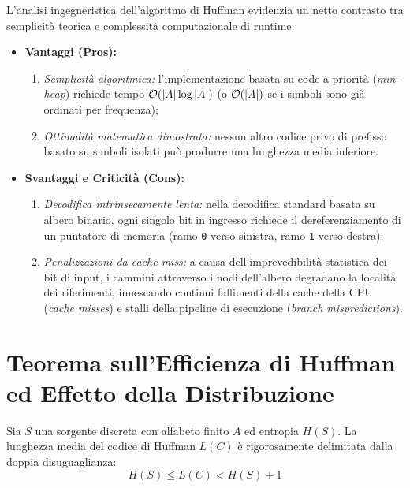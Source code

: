L'analisi ingegneristica dell'algoritmo di Huffman evidenzia un netto contrasto tra semplicit\`a teorica e complessit\`a computazionale di runtime:

\begin{itemize}
  \item \textbf{Vantaggi (Pros):}
  \begin{enumerate}
    \item \textit{Semplicit\`a algoritmica:} l'implementazione basata su code a priorit\`a (\textit{min-heap}) richiede tempo $\mathcal{O}\!\left(\vert A \vert \log \vert A \vert\right)$ (o $\mathcal{O}\!\left(\vert A \vert\right)$ se i simboli sono gi\`a ordinati per frequenza);
    \item \textit{Ottimalit\`a matematica dimostrata:} nessun altro codice privo di prefisso basato su simboli isolati pu\`o produrre una lunghezza media inferiore.
  \end{enumerate}

  \item \textbf{Svantaggi e Criticit\`a (Cons):}
  \begin{enumerate}
    \item \textit{Decodifica intrinsecamente lenta:} nella decodifica standard basata su albero binario, ogni singolo bit in ingresso richiede il dereferenziamento di un puntatore di memoria (ramo \texttt{0} verso sinistra, ramo \texttt{1} verso destra);
    \item \textit{Penalizzazioni da cache miss:} a causa dell'imprevedibilit\`a statistica dei bit di input, i cammini attraverso i nodi dell'albero degradano la localit\`a dei riferimenti, innescando continui fallimenti della cache della CPU (\textit{cache misses}) e stalli della pipeline di esecuzione (\textit{branch mispredictions}).
  \end{enumerate}
\end{itemize}

\FloatBarrier
\section{Teorema sull'Efficienza di Huffman ed Effetto della Distribuzione}
\label{sec:teorema-efficienza-distribuzione}

\begin{theorem}
\label{thm:efficienza-huffman}
Sia $S$ una sorgente discreta con alfabeto finito $A$ ed entropia $H(S)$. La lunghezza media del codice di Huffman $L(C)$ \`e rigorosamente delimitata dalla doppia disuguaglianza:
\begin{equation}
  H(S) \le L(C) < H(S) + 1
\end{equation}
\end{theorem}


